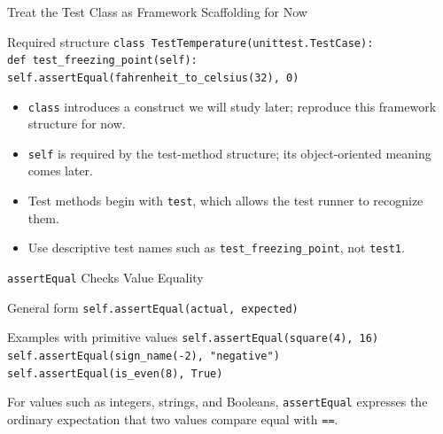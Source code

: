 \documentclass[aspectratio=169,10pt]{beamer}
\begin{document}
\begin{frame}{Treat the Test Class as Framework Scaffolding for Now}
  \begin{block}{Required structure}
    \texttt{class TestTemperature(unittest.TestCase):}\\
    \hspace*{0.20in}\texttt{def test\_freezing\_point(self):}\\
    \hspace*{0.40in}\texttt{self.assertEqual(fahrenheit\_to\_celsius(32), 0)}
  \end{block}

  \begin{itemize}
    \item \texttt{class} introduces a construct we will study later; reproduce this framework structure for now.
    \item \texttt{self} is required by the test-method structure; its object-oriented meaning comes later.
    \item Test methods begin with \texttt{test}, which allows the test runner to recognize them.
    \item Use descriptive test names such as \texttt{test\_freezing\_point}, not \texttt{test1}.
  \end{itemize}
\end{frame}

\begin{frame}{\texttt{assertEqual} Checks Value Equality}
  \begin{block}{General form}
    \texttt{self.assertEqual(actual, expected)}
  \end{block}

  \begin{block}{Examples with primitive values}
    \texttt{self.assertEqual(square(4), 16)}\\
    \texttt{self.assertEqual(sign\_name(-2), "negative")}\\
    \texttt{self.assertEqual(is\_even(8), True)}
  \end{block}

  \begin{keyidea}
    For values such as integers, strings, and Booleans, \texttt{assertEqual} expresses the ordinary expectation that two values compare equal with \texttt{==}.
  \end{keyidea}
\end{frame}
\end{document}
